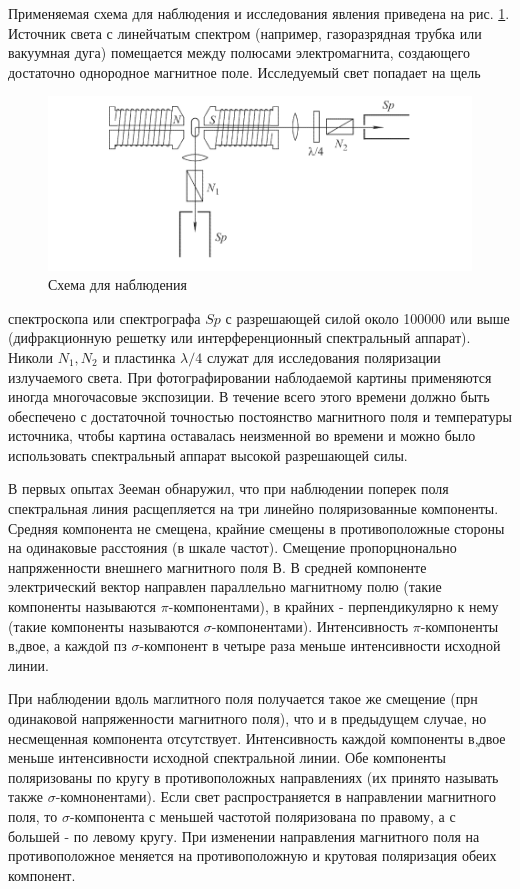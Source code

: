 \documentclass[12pt]{article}
\begin{document}
  Применяемая схема для наблюдения и исследования явления приведена на рис. \ref{fig:scheme}. Источник света с линейчатым спектром (например, газоразрядная трубка или вакуумная дуга) помещается между полюсами электромагнита, создающего достаточно однородное магнитное поле. Исследуемый свет попадает на щель

  \begin{figure}[H]
    \centering
    \includegraphics[width=\textwidth]{scheme.png}
    \caption{Схема для наблюдения}
    \label{fig:scheme}
  \end{figure}
  спектроскопа или спектрографа $S p$ с разрешающей силой около 100000 или выше (дифракционную решетку или интерференционный спектральный аппарат). Николи $N_1, N_2$ и пластинка $\lambda / 4$ служат для исследования поляризации излучаемого света. При фотографировании наблодаемой картины применяются иногда многочасовые экспозиции. В течение всего этого времени должно быть обеспечено с достаточной точностью постоянство магнитного поля и температуры источника, чтобы картина оставалась неизменной во времени и можно было использовать спектральный аппарат высокой разрешающей силы.

  В первых опытах Зееман обнаружил, что при наблюдении поперек поля спектральная линия расщепляется на три линейно поляризованные компоненты. Средняя компонента не смещена, крайние смещены в противоположные стороны на одинаковые расстояния (в шкале частот). Смещение пропорцнонально напряженности внешнего магнитного поля В. В средней компоненте электрический вектор направлен параллельно магнитному полю (такие компоненты называются $\pi$-компонентами), в крайних - перпендикулярно к нему (такие компоненты называются $\sigma$-компонентами). Интенсивность $\pi$-компоненты в,двое, а каждой пз $\sigma$-компонент в четыре раза меньше интенсивности исходной линии.

  При наблюдении вдоль маглитного поля получается такое же смещение (прн одинаковой напряженности магнитного поля), что и в предыдущем случае, но несмещенная компонента отсутствует. Интенсивность каждой компоненты в,двое меньше интенсивности исходной спектральной линии. Обе компоненты поляризованы по кругу в противоположных направлениях (их принято называть также $\sigma$-комнонентами). Если свет распространяется в направлении магнитного поля, то $\sigma$-компонента с меньшей частотой поляризована по правому, а с большей - по левому кругу. При изменении направления магнитного поля на противоположное меняется на противоположную и крутовая поляризация обеих компонент.
\end{document}
